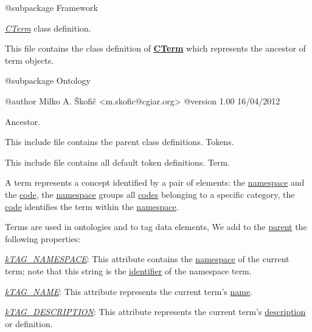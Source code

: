 \begin{DoxyVerb}    @subpackage     Framework\end{DoxyVerb}


{\itshape \hyperlink{class_c_term}{C\-Term}} class definition.

This file contains the class definition of {\bfseries \hyperlink{class_c_term}{C\-Term}} which represents the ancestor of term objects.

\begin{DoxyVerb}    @subpackage     Ontology

    @author         Milko A. Škofič <m.skofic@cgiar.org>
    @version        1.00 16/04/2012\end{DoxyVerb}


Ancestor.

This include file contains the parent class definitions. Tokens.

This include file contains all default token definitions. Term.

A term represents a concept identified by a pair of elements\-: the \hyperlink{}{namespace} and the \hyperlink{}{code}, the \hyperlink{}{namespace} groups all \hyperlink{}{codes} belonging to a specific category, the \hyperlink{}{code} identifies the term within the \hyperlink{}{namespace}.

Terms are used in ontologies and to tag data elements, We add to the \hyperlink{class_c_coded_unit_object}{parent} the following properties\-:


\begin{DoxyItemize}
\item {\itshape \hyperlink{}{k\-T\-A\-G\-\_\-\-N\-A\-M\-E\-S\-P\-A\-C\-E}}\-: This attribute contains the \hyperlink{}{namespace} of the current term; note that this string is the \hyperlink{}{identifier} of the namespace term. 
\item {\itshape \hyperlink{}{k\-T\-A\-G\-\_\-\-N\-A\-M\-E}}\-: This attribute represents the current term's \hyperlink{}{name}. 
\item {\itshape \hyperlink{}{k\-T\-A\-G\-\_\-\-D\-E\-S\-C\-R\-I\-P\-T\-I\-O\-N}}\-: This attribute represents the current term's \hyperlink{}{description} or definition. 
\end{DoxyItemize}

